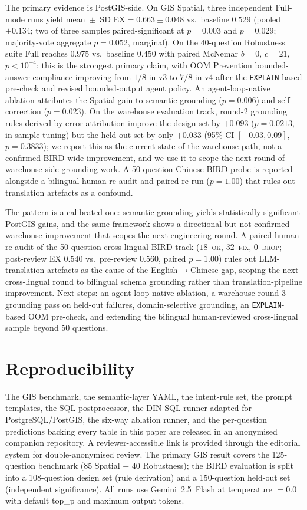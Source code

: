 \documentclass[11pt]{article}
\begin{document}
The primary evidence is PostGIS-side. On GIS Spatial, three independent Full-mode runs yield mean~$\pm$~SD EX$=0.663 \pm 0.048$ vs.\ baseline $0.529$ (pooled $+0.134$; two of three samples paired-significant at $p=0.003$ and $p=0.029$; majority-vote aggregate $p=0.052$, marginal). On the 40-question Robustness suite Full reaches $0.975$ vs.\ baseline $0.450$ with paired McNemar $b=0$, $c=21$, $p<10^{-4}$; this is the strongest primary claim, with OOM Prevention bounded-answer compliance improving from $1/8$ in v3 to $7/8$ in v4 after the \texttt{EXPLAIN}-based pre-check and revised bounded-output agent policy. An agent-loop-native ablation attributes the Spatial gain to semantic grounding ($p=0.006$) and self-correction ($p=0.023$). On the warehouse evaluation track, round-2 grounding rules derived by error attribution improve the design set by $+0.093$ ($p=0.0213$, in-sample tuning) but the held-out set by only $+0.033$ (95\% CI $[-0.03, 0.09]$, $p=0.3833$); we report this as the current state of the warehouse path, not a confirmed BIRD-wide improvement, and we use it to scope the next round of warehouse-side grounding work. A 50-question Chinese BIRD probe is reported alongside a bilingual human re-audit and paired re-run ($p=1.00$) that rules out translation artefacts as a confound.

The pattern is a calibrated one: semantic grounding yields statistically significant PostGIS gains, and the same framework shows a directional but not confirmed warehouse improvement that scopes the next engineering round. A paired human re-audit of the 50-question cross-lingual BIRD track ($18$~\textsc{ok}, $32$~\textsc{fix}, $0$~\textsc{drop}; post-review EX $0.540$ vs.\ pre-review $0.560$, paired $p=1.00$) rules out LLM-translation artefacts as the cause of the English$\to$Chinese gap, scoping the next cross-lingual round to bilingual schema grounding rather than translation-pipeline improvement. Next steps: an agent-loop-native ablation, a warehouse round-3 grounding pass on held-out failures, domain-selective grounding, an \texttt{EXPLAIN}-based OOM pre-check, and extending the bilingual human-reviewed cross-lingual sample beyond 50 questions.

\section*{Reproducibility}
The GIS benchmark, the semantic-layer YAML, the intent-rule set, the prompt templates, the SQL postprocessor, the DIN-SQL runner adapted for PostgreSQL/PostGIS, the six-way ablation runner, and the per-question predictions backing every table in this paper are released in an anonymised companion repository. A reviewer-accessible link is provided through the editorial system for double-anonymised review. The primary GIS result covers the 125-question benchmark (85 Spatial + 40 Robustness); the BIRD evaluation is split into a 108-question design set (rule derivation) and a 150-question held-out set (independent significance). All runs use Gemini~2.5~Flash at temperature $=0.0$ with default top\_p and maximum output tokens.
\end{document}
